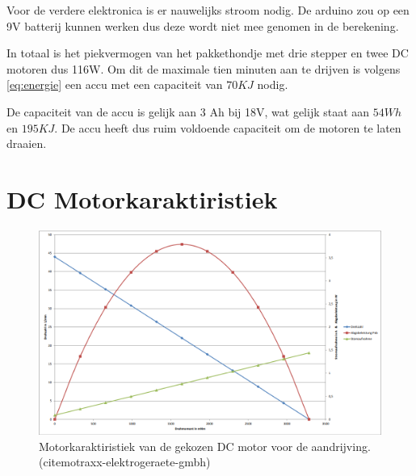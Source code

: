 Voor de verdere elektronica is er nauwelijks stroom nodig. De arduino zou op een 9V batterij kunnen werken dus deze wordt niet mee genomen in de berekening.

In totaal is het piekvermogen van het pakkethondje met drie stepper en twee DC motoren dus 116W. Om dit de maximale tien minuten aan te drijven is volgens \cref{eq:energie} een accu met een capaciteit van $70KJ$ nodig. 

De capaciteit van de accu is gelijk aan 3 Ah bij 18V, wat gelijk staat aan $54Wh$ en $195KJ$. De accu heeft dus ruim voldoende capaciteit om de motoren te laten draaien.


\section{DC Motorkaraktiristiek}

\begin{figure}[H]
    \centering
    \includegraphics[width=150mm]{06_Bijlage_H/motorkariskiristiek.png}
    \caption{Motorkaraktiristiek van de gekozen DC motor voor de aandrijving. (cite{motraxx-elektrogeraete-gmbh})}
    \label{fig:motorkaraktiristiek}
\end{figure}

